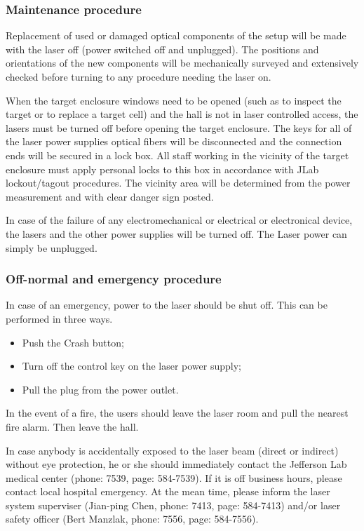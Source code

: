{\subsubsection{Maintenance procedure}

Replacement of used or damaged optical components of the setup will be made with the
laser off (power switched off and unplugged).  The positions and 
orientations of the new components will be mechanically
surveyed and extensively checked before turning to any procedure needing the laser on.

When the target enclosure windows need to be opened (such as to inspect
the target or to replace a 
target cell) and the hall is not in laser controlled access, 
the lasers must be turned off before opening the target enclosure.
The 
keys for all of the laser power supplies 
optical fibers will be disconnected and the connection ends
will be secured in a lock box.  All staff working in the
vicinity of the target enclosure 
must apply personal locks to this box in accordance with
JLab lockout/tagout procedures.
The vicinity area will be determined
from the power measurement and with clear danger sign posted.

In case of the failure of any electromechanical or electrical or electronical device,
the lasers and the other power supplies will be turned off. The Laser power
can simply be unplugged.


\subsubsection{Off-normal and emergency procedure}

In case of an emergency, power to the laser should be shut off.
This can be performed in three ways.
\begin {itemize}
\item Push the Crash button;
\item Turn off the control key on the laser power supply;
\item Pull the plug from the power outlet.
\end {itemize}

In the event of a fire, the users should leave the laser room and pull the 
nearest fire alarm. Then leave the hall.

In case anybody is accidentally exposed to the laser beam (direct or indirect)
without eye protection, he or she should immediately contact the Jefferson
Lab medical center (phone: 7539, page: 584-7539). If it is 
off business hours, please contact local hospital emergency. At the mean time,
please inform the laser system superviser (Jian-ping Chen, phone: 7413,
page: 584-7413) and/or laser safety officer (Bert Manzlak, phone: 7556,
page: 584-7556). 


}

